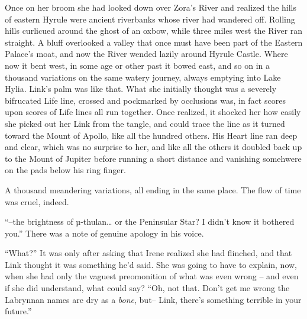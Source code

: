 \documentclass[../FGP.tex]{subfiles}
\begin{document}
Once on her broom she had looked down over Zora's River and realized the hills of eastern Hyrule were ancient riverbanks whose river had wandered off.%
    \normalmarginpar{}
Rolling hills curl\-i\-cued around the ghost of an oxbow, while three miles west the River ran straight. A bluff overlooked a valley that once must have been part of the Eastern Palace's moat, and now the River wended lazily around Hyrule Castle. Where now it bent west, in some age or other past it bowed east, and so on in a thousand variations on the same watery journey, always emptying into Lake Hylia. Link's palm was like that. What she initially thought was a severely bifrucated Life line, crossed and pockmarked by occlusions was, in  fact scores upon scores of Life lines all run together. Once realized, it shocked her how easily she picked out her Link from the tangle, and could trace the line as it turned toward the Mount of Apollo, like all the hundred others. His Heart line ran deep and clear, which was no surprise to her, and like all the others it doubled back up to the Mount of Jupiter before running a short distance and vanishing somehwere on the pads below his ring finger. 

A thousand meandering variations, all ending in the same place. The flow of time was cruel, indeed.

\normalmarginpar``--the brightness of {\Gr µ}-thulan\ldots{} or the Peninsular Star? I didn't know it bothered you.'' There was a note of genuine apology in his voice.

``What?'' It was only after asking that Irene realized she had flinched, and that Link thought it was something he'd said. She was going to have to explain, now, when she had only the vaguest preomonition of what was even wrong -- and even if she did understand, what could say? ``Oh, not that. Don't get me wrong the Labrynnan names are dry as a \emph{bone}, but-- Link, there's something terrible in your future.''  
\end{document}
